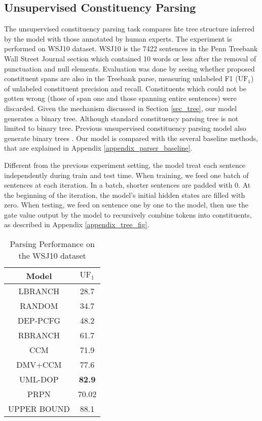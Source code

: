 \documentclass{article} \usepackage{iclr2018_conference,times}
\begin{document}
\subsection{Unsupervised Constituency Parsing}  \label{unsupervised_parsing_exp}
The unsupervised constituency parsing task compares hte tree structure inferred by the model with those annotated by human experts. The experiment is performed on WSJ10 dataset. WSJ10 is the 7422 sentences in the Penn Treebank Wall Street Journal section which contained 10 words or less after the removal of punctuation and null elements. Evaluation was done by seeing whether proposed constituent spans are also in the Treebank parse, measuring unlabeled F1 ($\mathrm{UF}_1$) of unlabeled constituent precision and recall. Constituents which could not be gotten wrong (those of span one and those spanning entire sentences) were discarded. Given the mechanism discussed in Section \ref{sec_tree}, our model generates a binary tree.
Although standard constituency parsing tree is not limited to binary tree. Previous unsupervised constituency parsing model also generate binary trees \citep{klein2002generative,bod2006all}. Our model is compared with the several baseline methods, that are explained in Appendix \ref{appendix_parser_baseline}.

Different from the previous experiment setting, the model treat each sentence independently during train and test time. When training, we feed one batch of sentences at each iteration. In a batch, shorter sentences are padded with 0. At the beginning of the iteration, the model's initial hidden states are filled with zero. When testing, we feed on sentence one by one to the model, then use the gate value output by the model to recursively combine tokens into constituents, as described in Appendix \ref{appendix_tree_fig}. 

\begin{table}[h]  
\centering  
  \begin{tabular}{ c c }
    \toprule[2pt]
    Model & $\mathrm{UF}_1$ \\
    \hline
    LBRANCH &  28.7 \\
    RANDOM & 34.7 \\
    DEP-PCFG \citep{carroll1992two} & 48.2 \\
    RBRANCH & 61.7 \\
    CCM \citep{klein2002generative} & 71.9 \\
    DMV+CCM \citep{klein2005natural} & 77.6 \\
    UML-DOP \citep{bod2006all} & \textbf{82.9} \\
    \hline
    PRPN & 70.02 \\
    \hline
    UPPER BOUND & 88.1 \\
    \toprule[2pt]
  \end{tabular}
  \caption{Parsing Performance on the WSJ10 dataset}
  \label{tb_parser}
\end{table}
\end{document}
